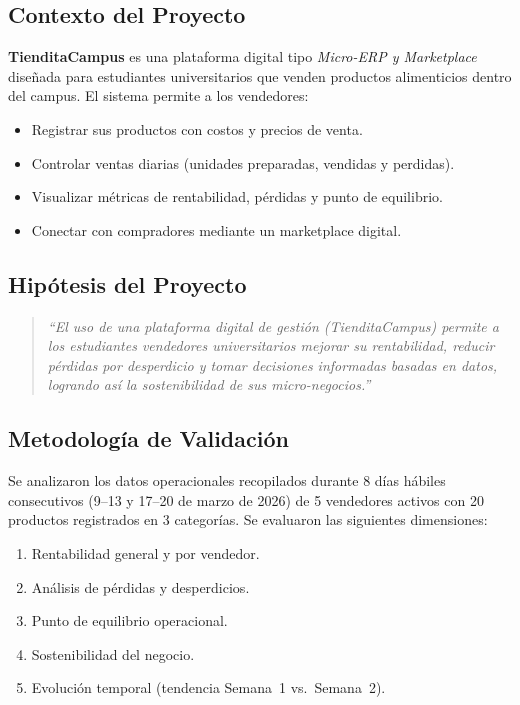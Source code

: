 \documentclass[12pt,letterpaper]{article}
\begin{document}
\subsection{Contexto del Proyecto}
\textbf{TienditaCampus} es una plataforma digital tipo \textit{Micro-ERP y Marketplace} diseñada para estudiantes universitarios que venden productos alimenticios dentro del campus. El sistema permite a los vendedores:

\begin{itemize}[leftmargin=2em]
    \item Registrar sus productos con costos y precios de venta.
    \item Controlar ventas diarias (unidades preparadas, vendidas y perdidas).
    \item Visualizar métricas de rentabilidad, pérdidas y punto de equilibrio.
    \item Conectar con compradores mediante un marketplace digital.
\end{itemize}

\subsection{Hipótesis del Proyecto}
\begin{quote}
\textit{``El uso de una plataforma digital de gestión (TienditaCampus) permite a los estudiantes vendedores universitarios mejorar su rentabilidad, reducir pérdidas por desperdicio y tomar decisiones informadas basadas en datos, logrando así la sostenibilidad de sus micro-negocios.''}
\end{quote}

\subsection{Metodología de Validación}
Se analizaron los datos operacionales recopilados durante 8 días hábiles consecutivos (9--13 y 17--20 de marzo de 2026) de 5 vendedores activos con 20 productos registrados en 3 categorías. Se evaluaron las siguientes dimensiones:

\begin{enumerate}[leftmargin=2em]
    \item Rentabilidad general y por vendedor.
    \item Análisis de pérdidas y desperdicios.
    \item Punto de equilibrio operacional.
    \item Sostenibilidad del negocio.
    \item Evolución temporal (tendencia Semana~1 vs.\ Semana~2).
\end{enumerate}
\end{document}
